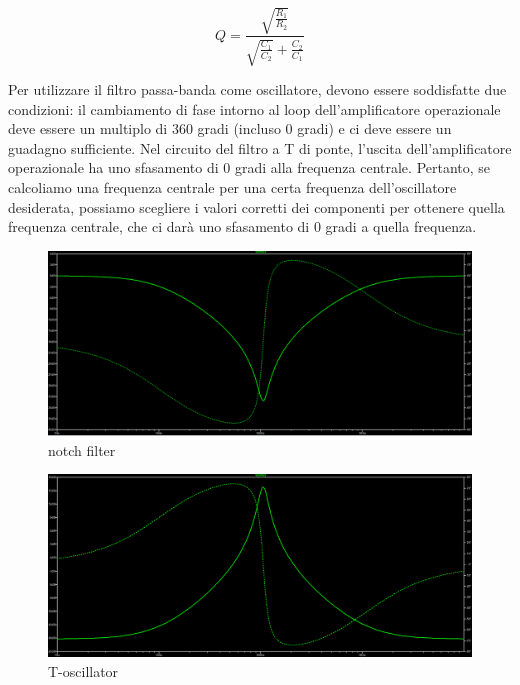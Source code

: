 \documentclass{article}
\begin{document}
\begin{equation}
    Q = \frac{\sqrt{\frac{R_1}{R_2}}}{\sqrt{\frac{C_1}{C_2}} + {\frac{C_2}{C_1}}}
\end{equation}


Per utilizzare il filtro passa-banda come oscillatore, devono essere soddisfatte due condizioni: il cambiamento di fase intorno al loop dell'amplificatore operazionale deve essere un multiplo di 360 gradi (incluso 0 gradi) e ci deve essere un guadagno sufficiente.
Nel circuito del filtro a T di ponte, l'uscita dell'amplificatore operazionale ha uno sfasamento di 0 gradi alla frequenza centrale. Pertanto, se calcoliamo una frequenza centrale per una certa frequenza dell'oscillatore desiderata, possiamo scegliere i valori corretti dei componenti per ottenere quella frequenza centrale, che ci darà uno sfasamento di 0 gradi a quella frequenza. 

\begin{figure}[htp]
    \centering
    \includegraphics[width=\textwidth]{notch2.png} 
    \caption{notch filter}
    \label{fig:Notch-filter}
\end{figure}

\begin{figure}[htp]
    \centering
    \includegraphics[width=\textwidth]{toscillatorefrequency.png} 
    \caption{T-oscillator}
    \label{fig:Toscillator-plot}
\end{figure}
\end{document}
